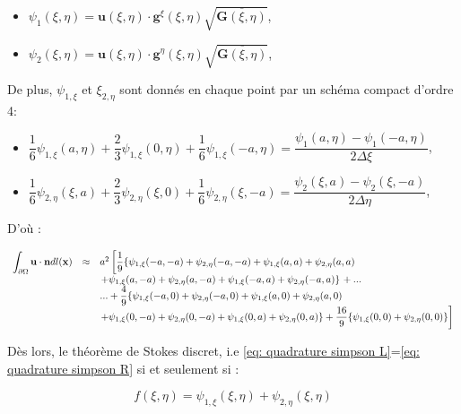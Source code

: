 \begin{itemize}
\item $\psi_1(\xi, \eta) = \mathbf{u}(\xi, \eta) \cdot \mathbf{g}^{\xi}(\xi, \eta) \sqrt{\overline{\mathbf{G}(\xi, \eta)}}$,
\item $\psi_2(\xi, \eta) = \mathbf{u}(\xi, \eta) \cdot \mathbf{g}^{\eta}(\xi, \eta) \sqrt{\overline{\mathbf{G}(\xi, \eta)}}$,
\end{itemize}

De plus, $\psi_{1,\xi}$ et $\xi_{2,\eta}$ sont donnés en chaque point par un schéma compact d'ordre 4:

\begin{itemize}
\item $\dfrac{1}{6}\psi_{1,\xi}(a, \eta)+\dfrac{2}{3}\psi_{1,\xi}(0, \eta)+\dfrac{1}{6}\psi_{1,\xi}(-a, \eta) = \dfrac{\psi_1(a,\eta)-\psi_1(-a,\eta)}{2 \Delta \xi}$,
\item $\dfrac{1}{6}\psi_{2,\eta}(\xi,a)+\dfrac{2}{3}\psi_{2,\eta}(\xi,0)+\dfrac{1}{6}\psi_{2,\eta}(\xi,-a) = \dfrac{\psi_2(\xi,a)-\psi_2(\xi,-a)}{2 \Delta \eta}$,
\end{itemize}

D'où :

\begin{equation}
\begin{array}{rcl}
\displaystyle\int_{\partial \Omega} \mathbf{u} \cdot \mathbf{n} dl(\mathbf{x}) & \approx &  a^2 \left[ \dfrac{1}{9} \lbrace  \psi_{1,\xi}(-a,-a)+\psi_{2,\eta}(-a,-a)+\psi_{1,\xi}(a,a)+\psi_{2,\eta}(a,a) \right. \\
& & \left. +\psi_{1,\xi}(a,-a)+\psi_{2,\eta}(a,-a)+\psi_{1,\xi}(-a,a)+\psi_{2,\eta}(-a,a)  \rbrace \right. + ...\\
& & ...+ \dfrac{4}{9} \lbrace  \psi_{1,\xi}(-a,0)+\psi_{2,\eta}(-a,0)+\psi_{1,\xi}(a,0)+\psi_{2,\eta}(a,0) \\
& & \left. +\psi_{1,\xi}(0,-a)+\psi_{2,\eta}(0,-a)+\psi_{1,\xi}(0,a)+\psi_{2,\eta}(0,a)   \rbrace + \dfrac{16}{9} \lbrace \psi_{1,\xi}(0,0)+\psi_{2,\eta}(0,0) \rbrace \right]
\end{array}
\label{eq: quadrature simpson R}
\end{equation}

Dès lors, le théorème de Stokes discret, i.e \eqref{eq: quadrature simpson L}=\eqref{eq: quadrature simpson R} si et seulement si :

\begin{equation}
f(\xi,\eta) = \psi_{1,\xi}(\xi,\eta)+\psi_{2,\eta}(\xi,\eta)
\end{equation}

